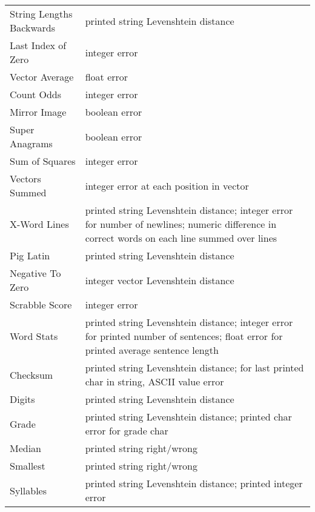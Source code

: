 \documentclass{sig-alternate}
\begin{document}
\begin{table*}[t]
\begin{tabular}{>{\raggedright}p{4cm} >{\raggedright}p{11cm}}
String Lengths Backwards   & printed string Levenshtein distance                                                                                                   \tabularnewline
Last Index of Zero         & integer error                                                                                                                  \tabularnewline
Vector Average             & float error                                                                                                                    \tabularnewline
Count Odds                 & integer error                                                                                                                  \tabularnewline
Mirror Image               & boolean error                                                                                                                  \tabularnewline
Super Anagrams             & boolean error                                                                                                                  \tabularnewline
Sum of Squares             & integer error                                                                                                                  \tabularnewline
Vectors Summed             & integer error at each position in vector \tabularnewline
X-Word Lines               & printed string Levenshtein distance; integer error for number of newlines; numeric difference in correct words on each line summed over lines \tabularnewline
Pig Latin                  & printed string Levenshtein distance                                                                                                   \tabularnewline
Negative To Zero           & integer vector Levenshtein distance                                                                                                   \tabularnewline
Scrabble Score             & integer error                                                                                                                  \tabularnewline
Word Stats                 & printed string Levenshtein distance; integer error for printed number of sentences; float error for printed average sentence length             \tabularnewline
Checksum                   & printed string Levenshtein distance; for last printed char in string, ASCII value error \tabularnewline
Digits                     & printed string Levenshtein distance                                                                                                   \tabularnewline
Grade                      & printed string Levenshtein distance; printed char error for grade char \tabularnewline
Median                     & printed string right/wrong \tabularnewline
Smallest                   & printed string right/wrong \tabularnewline
Syllables                  & printed string Levenshtein distance; printed integer error  \tabularnewline     
\bottomrule
\end{tabular}
\end{table*}
\end{document}
